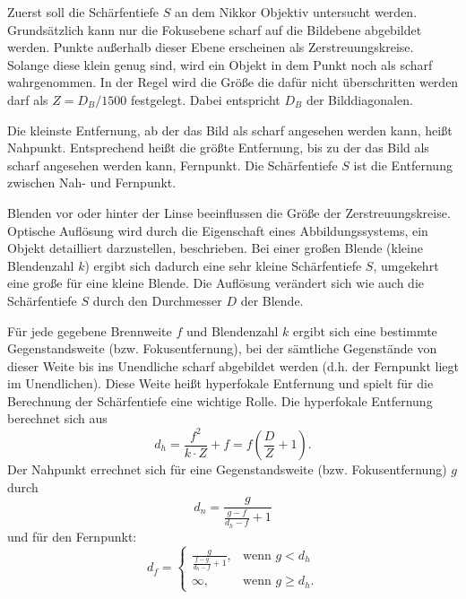 		Zuerst soll die Schärfentiefe $S$ an dem Nikkor Objektiv untersucht werden. 	
		Grundsätzlich kann nur die Fokusebene scharf auf die Bildebene abgebildet werden. 
		Punkte außerhalb dieser Ebene erscheinen als Zerstreuungskreise. 
		Solange diese klein genug sind, wird ein Objekt in dem Punkt noch als scharf wahrgenommen.
		In der Regel wird die Größe die dafür nicht überschritten werden darf als $Z = D_B/1500$ festgelegt.
		Dabei entspricht $D_B$ der Bilddiagonalen.
		
		Die kleinste Entfernung, ab der das Bild als scharf angesehen werden kann, heißt Nahpunkt. Entsprechend heißt die größte Entfernung, bis zu der das Bild als scharf angesehen werden kann, Fernpunkt. Die Schärfentiefe $S$ ist die Entfernung zwischen Nah- und Fernpunkt.
		
		Blenden vor oder hinter der Linse beeinflussen die Größe der Zerstreuungskreise. 
		Optische Auflösung wird durch die Eigenschaft eines Abbildungssystems, ein Objekt detailliert darzustellen, beschrieben. 
		Bei einer großen Blende (kleine Blendenzahl $k$) ergibt sich dadurch eine sehr kleine Schärfentiefe $S$, umgekehrt eine große für eine kleine Blende. 
		Die Auflösung verändert sich wie auch die Schärfentiefe $S$ durch den Durchmesser $D$ der Blende.
		
		Für jede gegebene Brennweite $f$ und Blendenzahl $k$ ergibt sich eine bestimmte Gegenstandsweite (bzw. Fokusentfernung), bei der sämtliche Gegenstände von dieser Weite bis ins Unendliche scharf abgebildet werden (d.h. der Fernpunkt liegt im Unendlichen). Diese Weite heißt hyperfokale Entfernung und spielt für die Berechnung der Schärfentiefe eine wichtige Rolle.
		Die hyperfokale Entfernung berechnet sich aus
		\begin{equation} \label{eq:hyperfokal}
			d_h = \frac{f^2}{k\cdot Z} + f = f \left( \frac{D}{Z}+1\right) .
		\end{equation}
		Der Nahpunkt errechnet sich für eine Gegenstandsweite (bzw. Fokusentfernung) $g$ durch
		\begin{equation} \label{eq:nah}
			d_n = \frac{g}{\frac{g-f}{d_h-f}+1}
		\end{equation} 
		und für den Fernpunkt:
		\begin{equation} \label{eq:fern}
			d_f = 
			\begin{cases}
				\frac{g}{\frac{f-g}{d_h-f}+1}, & \text{wenn } g < d_h \\
				\infty, & \text{wenn } g \geq d_h .
			\end{cases}
		\end{equation}
		
